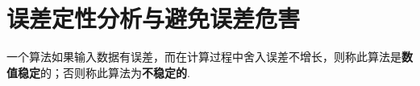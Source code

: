 \documentclass[../../main.tex]{subfiles}%
\begin{document}
\section{误差定性分析与避免误差危害}

\begin{definition}
一个算法如果输入数据有误差，而在计算过程中舍入误差不增长，则称此算法是\textbf{数值稳定}的；否则称此算法为\textbf{不稳定的}.
\end{definition}

\begin{example}

\end{example}
\begin{solution}



\end{solution}
\end{document}
